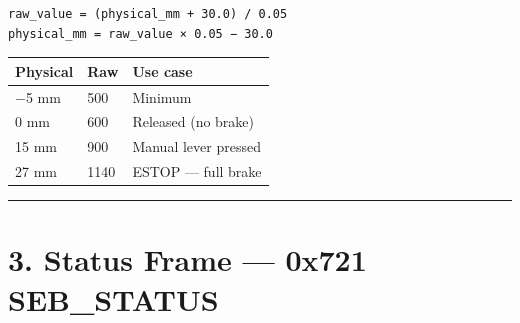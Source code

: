 \documentclass[12pt,a4paper,oneside]{report}
\begin{document}
\begin{verbatim}
raw_value = (physical_mm + 30.0) / 0.05
physical_mm = raw_value × 0.05 − 30.0
\end{verbatim}

\begin{longtable}[]{@{}lll@{}}
\toprule\noalign{}
Physical & Raw & Use case \\
\midrule\noalign{}
\endhead
\bottomrule\noalign{}
\endlastfoot
−5 mm & 500 & Minimum \\
0 mm & 600 & Released (no brake) \\
15 mm & 900 & Manual lever pressed \\
27 mm & 1140 & ESTOP --- full brake \\
\end{longtable}

\begin{center}\rule{0.5\linewidth}{0.5pt}\end{center}

\section{3. Status Frame --- 0x721
SEB\_STATUS}\label{status-frame-0x721-seb_status}
\end{document}
